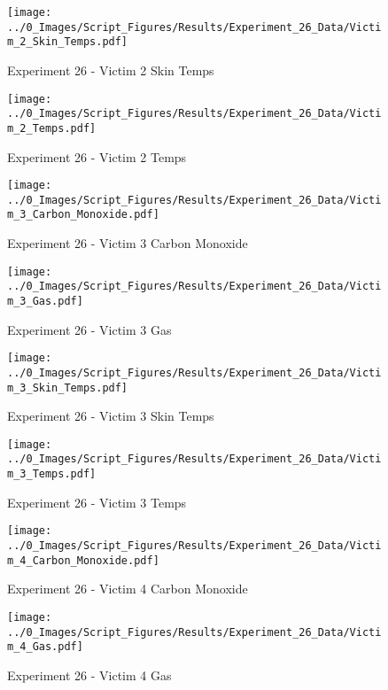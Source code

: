 	\clearpage

	\begin{figure}[H]
		\centering
		\texttt{[image: ../0\_Images/Script\_Figures/Results/Experiment\_26\_Data/Victim\_2\_Skin\_Temps.pdf]}
		\caption[]{Experiment 26 - Victim 2 Skin Temps}
	\end{figure}
 

	\begin{figure}[H]
		\centering
		\texttt{[image: ../0\_Images/Script\_Figures/Results/Experiment\_26\_Data/Victim\_2\_Temps.pdf]}
		\caption[]{Experiment 26 - Victim 2 Temps}
	\end{figure}
 
	\clearpage

	\begin{figure}[H]
		\centering
		\texttt{[image: ../0\_Images/Script\_Figures/Results/Experiment\_26\_Data/Victim\_3\_Carbon\_Monoxide.pdf]}
		\caption[]{Experiment 26 - Victim 3 Carbon Monoxide}
	\end{figure}
 

	\begin{figure}[H]
		\centering
		\texttt{[image: ../0\_Images/Script\_Figures/Results/Experiment\_26\_Data/Victim\_3\_Gas.pdf]}
		\caption[]{Experiment 26 - Victim 3 Gas}
	\end{figure}
 
	\clearpage

	\begin{figure}[H]
		\centering
		\texttt{[image: ../0\_Images/Script\_Figures/Results/Experiment\_26\_Data/Victim\_3\_Skin\_Temps.pdf]}
		\caption[]{Experiment 26 - Victim 3 Skin Temps}
	\end{figure}
 

	\begin{figure}[H]
		\centering
		\texttt{[image: ../0\_Images/Script\_Figures/Results/Experiment\_26\_Data/Victim\_3\_Temps.pdf]}
		\caption[]{Experiment 26 - Victim 3 Temps}
	\end{figure}
 
	\clearpage

	\begin{figure}[H]
		\centering
		\texttt{[image: ../0\_Images/Script\_Figures/Results/Experiment\_26\_Data/Victim\_4\_Carbon\_Monoxide.pdf]}
		\caption[]{Experiment 26 - Victim 4 Carbon Monoxide}
	\end{figure}
 

	\begin{figure}[H]
		\centering
		\texttt{[image: ../0\_Images/Script\_Figures/Results/Experiment\_26\_Data/Victim\_4\_Gas.pdf]}
		\caption[]{Experiment 26 - Victim 4 Gas}
	\end{figure}
 

